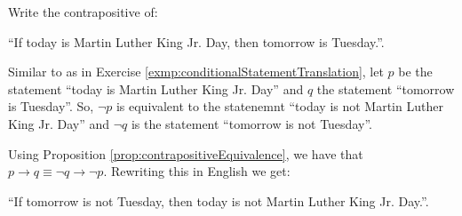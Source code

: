 \guard




\begin{exmp}
\label{exmp:contrapositiveStatementTranslation}
  Write the contrapositive of:
  \begin{center}
    ``If today is Martin Luther King Jr. Day, then tomorrow is Tuesday.''.
  \end{center}

  Similar to as in Exercise \ref{exmp:conditionalStatementTranslation}, let $p$ be the statement ``today is Martin Luther King Jr. Day'' and $q$ the statement ``tomorrow is Tuesday''.
  So, $\neg p$ is equivalent to the statenemnt ``today is not Martin Luther King Jr. Day'' and $\neg q$ is the statement ``tomorrow is not Tuesday''.

  Using Proposition \ref{prop:contrapositiveEquivalence}, we have that $p\rightarrow q \equiv \neg q \rightarrow \neg p$.
  Rewriting this in English we get:
  \begin{center}
    ``If tomorrow is not Tuesday, then today is not Martin Luther King Jr. Day.''.
  \end{center}
\end{exmp}
